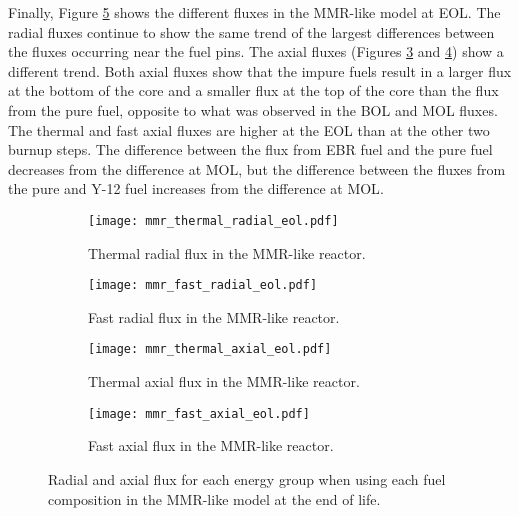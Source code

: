 Finally, Figure \ref{fig:mmr_eol} shows the different fluxes in the 
\gls{MMR}-like model at \gls{EOL}. The radial fluxes continue to show 
the same trend of the largest differences between the fluxes occurring near
the fuel pins. The axial fluxes (Figures \ref{fig:mmr_thermal_axial_eol} and 
\ref{fig:mmr_fast_axial_eol}) show a different trend. Both axial 
fluxes show that the impure fuels result in a larger flux at the 
bottom of the core and a smaller flux at the top of the core than the flux 
from the pure fuel, opposite
to what was observed in the \gls{BOL} and \gls{MOL} fluxes. The thermal 
and fast axial fluxes are higher at the \gls{EOL} than at the other 
two burnup steps. The difference between the flux from \gls{EBR} fuel 
and the pure fuel decreases from the difference at \gls{MOL}, but the 
difference between the fluxes from the pure and Y-12 fuel 
increases from the difference at \gls{MOL}. 
   
\begin{figure}[h!]
        \centering
        \begin{subfigure}[b]{0.48\textwidth}
            \centering
            \texttt{[image: mmr\_thermal\_radial\_eol.pdf]}
            \caption{Thermal radial flux in the \gls{MMR}-like reactor.}
            \label{fig:mmr_thermal_radial_eol}
        \end{subfigure}
        \hfill
        \begin{subfigure}[b]{0.48\textwidth}
            \centering
            \texttt{[image: mmr\_fast\_radial\_eol.pdf]}
            \caption{Fast radial flux in the \gls{MMR}-like reactor.}
            \label{fig:mmr_fast_radial_eol}
        \end{subfigure}
        \hfill
            
        \begin{subfigure}[b]{0.48\textwidth}
            \centering
            \texttt{[image: mmr\_thermal\_axial\_eol.pdf]}
            \caption{Thermal axial flux in the \gls{MMR}-like reactor. }
            \label{fig:mmr_thermal_axial_eol}
        \end{subfigure}
        \hfill
        \begin{subfigure}[b]{0.48\textwidth}
            \centering
            \texttt{[image: mmr\_fast\_axial\_eol.pdf]}
            \caption{Fast axial flux in the \gls{MMR}-like reactor.}
            \label{fig:mmr_fast_axial_eol}
        \end{subfigure}
        \hfill
        \caption{Radial and axial flux for each energy group when using 
        each fuel composition in the \gls{MMR}-like model at the end 
        of life.}
        \label{fig:mmr_eol}
   \end{figure}


